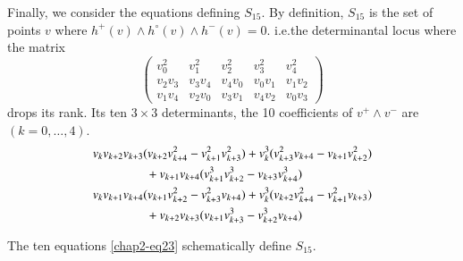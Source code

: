 Finally, we consider the equations defining $S_{15}$. By definition,
$S_{15}$ is the set of points $v$ where $h^{+}(v)\wedge
h^{\circ}(v)\wedge h^{-}(v)=0$. i.e.\@ the determinantal locus where
the matrix 
$$
\begin{pmatrix}
v^{2}_{0} & v^{2}_{1} & v^{2}_{2} & v^{2}_{3} & v^{2}_{4}\\[4pt]
v_{2}v_{3} & v_{3}v_{4} & v_{4}v_{0} & v_{0}v_{1} & v_{1}v_{2}\\[4pt]
v_{1}v_{4} & v_{2}v_{0} & v_{3}v_{1} & v_{4}v_{2} & v_{0}v_{3}
\end{pmatrix}
$$\pageoriginale
drops its rank. Its ten $3\times 3$ determinants, the 10 coefficients
of $v^{+}\wedge v^{-}$ are $(k=0,\ldots,4)$.
\begin{equation}
\begin{split}
&
v_{k}v_{k+2}v_{k+3}(v_{k+2}v^{2}_{k+4}-v^{2}_{k+1}v^{2}_{k+3})+v^{3}_{k}(v^{2}_{k+3}v_{k+4}-v_{k+1}v^{2}_{k+2})\\
&\hspace{1.5cm}
+v_{k+1}v_{k+4}(v^{3}_{k+1}v^{3}_{k+2}-v_{k+3}v^{3}_{k+4})\\
&
v_{k}v_{k+1}v_{k+4}(v_{k+1}v^{2}_{k+2}-v^{2}_{k+3}v_{k+4})+v^{3}_{k}(v_{k+2}v^{2}_{k+4}-v^{2}_{k+1}v_{k+3})\\
&\hspace{1.5cm} +v_{k+2}v_{k+3}(v_{k+1}v^{3}_{k+3}-v^{3}_{k+2}v_{k+4})
\end{split}\label{chap2-eq23}
\end{equation}

\begin{proposition}\label{chap2-prop11}
The ten equations \eqref{chap2-eq23} schematically define $S_{15}$.
\end{proposition}

